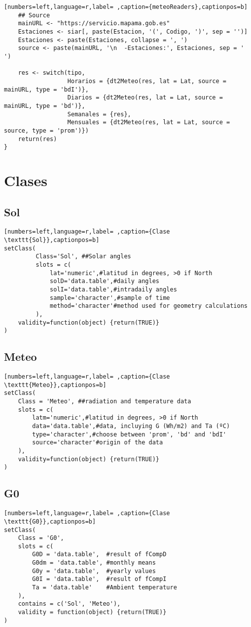 \begin{lstlisting}[numbers=left,language=r,label= ,caption={meteoReaders},captionpos=b]
    ## Source
    mainURL <- "https://servicio.mapama.gob.es"
    Estaciones <- siar[, paste(Estacion, '(', Codigo, ')', sep = '')]
    Estaciones <- paste(Estaciones, collapse = ', ')
    source <- paste(mainURL, '\n  -Estaciones:', Estaciones, sep = ' ')

    res <- switch(tipo,
                  Horarios = {dt2Meteo(res, lat = Lat, source = mainURL, type = 'bdI')},
                  Diarios = {dt2Meteo(res, lat = Lat, source = mainURL, type = 'bd')},
                  Semanales = {res},
                  Mensuales = {dt2Meteo(res, lat = Lat, source = source, type = 'prom')})
    return(res)
}
\end{lstlisting}

\section{Clases}
\label{sec:orge5805aa}
\subsection{Sol}
\label{sec:org3ab19a8}
\begin{lstlisting}[numbers=left,language=r,label= ,caption={Clase \texttt{Sol}},captionpos=b]
setClass(
         Class='Sol', ##Solar angles
         slots = c(
             lat='numeric',#latitud in degrees, >0 if North
             solD='data.table',#daily angles
             solI='data.table',#intradaily angles
             sample='character',#sample of time
             method='character'#method used for geometry calculations
         ),
    validity=function(object) {return(TRUE)}
)
\end{lstlisting}
\subsection{Meteo}
\label{sec:org7f61484}
\begin{lstlisting}[numbers=left,language=r,label= ,caption={Clase \texttt{Meteo}},captionpos=b]
setClass(
    Class = 'Meteo', ##radiation and temperature data
    slots = c(
        latm='numeric',#latitud in degrees, >0 if North
        data='data.table',#data, incluying G (Wh/m2) and Ta (ºC)
        type='character',#choose between 'prom', 'bd' and 'bdI'
        source='character'#origin of the data
    ),
    validity=function(object) {return(TRUE)}
)
\end{lstlisting}
\subsection{G0}
\label{sec:org25909f3}
\begin{lstlisting}[numbers=left,language=r,label= ,caption={Clase \texttt{G0}},captionpos=b]
setClass(
    Class = 'G0',
    slots = c(
        G0D = 'data.table',  #result of fCompD
        G0dm = 'data.table', #monthly means
        G0y = 'data.table',  #yearly values
        G0I = 'data.table',  #result of fCompI
        Ta = 'data.table'    #Ambient temperature
    ),
    contains = c('Sol', 'Meteo'),
    validity = function(object) {return(TRUE)}
)

\end{lstlisting}

